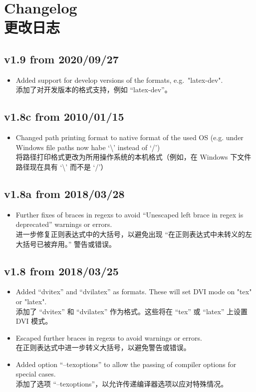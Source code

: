 \documentclass{article}
\begin{document}
\section{Changelog\\更改日志}

\subsection*{v1.9 from 2020/09/27}
\begin{itemize}
 \item Added support for develop versions of the formats, e.g.\ "latex-dev".
\\添加了对开发版本的格式支持，例如 “latex-dev”。
\end{itemize}

\subsection*{v1.8c from 2010/01/15}
\begin{itemize}
 \item Changed path printing format to native format of the used OS 
      (e.g. under Windows file paths now habe `\textbackslash' instead of `/')
\\将路径打印格式更改为所用操作系统的本机格式（例如，在 Windows 下文件路径现在具有 `\textbackslash' 而不是 `/'）
\end{itemize}

\subsection*{v1.8a from 2018/03/28}
\begin{itemize}
 \item Further fixes of braces in regexs to avoid ``Unescaped left brace in regex is deprecated'' warnings or errors.
\\进一步修复正则表达式中的大括号，以避免出现 ``在正则表达式中未转义的左大括号已被弃用。'' 警告或错误。
\end{itemize}

\subsection*{v1.8 from 2018/03/25}
\begin{itemize}
 \item Added ``dvitex'' and ``dvilatex'' as formats. These will set DVI mode on "tex" or "latex".
 \\添加了 “dvitex” 和 “dvilatex” 作为格式。这些将在 “tex” 或 “latex” 上设置 DVI 模式。
 \item Escaped further braces in regexs to avoid warnings or errors.
 \\在正则表达式中进一步转义大括号，以避免警告或错误。
 \item Added option ``--texoptions'' to allow the passing of compiler options for special cases.
 \\添加了选项 “–texoptions”，以允许传递编译器选项以应对特殊情况。
\end{itemize}
\end{document}
